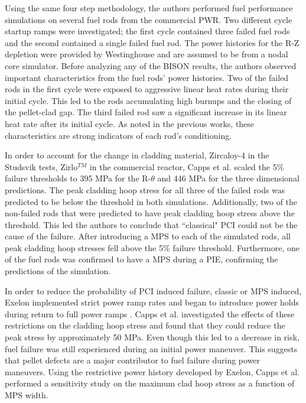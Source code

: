 \documentclass[edeposit,fullpage,11pt]{uiucthesis2009}
\begin{document}
Using the same four step methodology, the authors performed fuel performance simulations on several fuel rods from the commercial \gls{PWR}.
Two different cycle startup ramps were investigated; the first cycle contained three failed fuel rods and the second contained a single failed fuel rod.
The power histories for the R-Z depletion were provided by Westinghouse and are assumed to be from a nodal core simulator.
Before analyzing any of the BISON results, the authors observed important characteristics from the fuel rods' power histories.
Two of the failed rods in the first cycle were exposed to aggressive linear heat rates during their initial cycle.
This led to the rods accumulating high burnups and the closing of the pellet-clad gap.
The third failed rod saw a significant increase in its linear heat rate after its initial cycle.
As noted in the previous works, these characteristics are strong indicators of each rod's conditioning.

In order to account for the change in cladding material, Zircaloy-4 in the Studsvik tests, Zirlo$^{TM}$ in the commercial reactor, Capps et al. scaled the 5\% failure thresholds to 395 MPa for the R-$\theta$ and 446 MPa for the three dimensional predictions.
The peak cladding hoop stress for all three of the failed rods was predicted to be below the threshold in both simulations.
Additionally, two of the non-failed rods that were predicted to have peak cladding hoop stress above the threshold. 
This led the authors to conclude that ``classical" \gls{PCI} could not be the cause of the failure.
After introducing a \gls{MPS} to each of the simulated rods, all peak cladding hoop stresses fell above the 5\% failure threshold.
Furthermore, one of the fuel rods was confirmed to have a \gls{MPS} during a \gls{PIE}, confirming the predictions of the simulation.

In order to reduce the probability of \gls{PCI} induced failure, classic or \gls{MPS} induced, Exelon implemented strict power ramp rates and began to introduce power holds during return to full power ramps \cite{capps_pci_2017}.
Capps et al. investigated the effects of these restrictions on the cladding hoop stress and found that they could reduce the peak stress by approximately 50 MPa.
Even though this led to a decrease in risk, fuel failure was still experienced during an initial power maneuver.
This suggests that pellet defects are a major contributor to fuel failure during power maneuvers. 
Using the restrictive power history developed by Exelon, Capps et al. performed a sensitivity study on the maximum clad hoop stress as a function of \gls{MPS} width.
\end{document}
